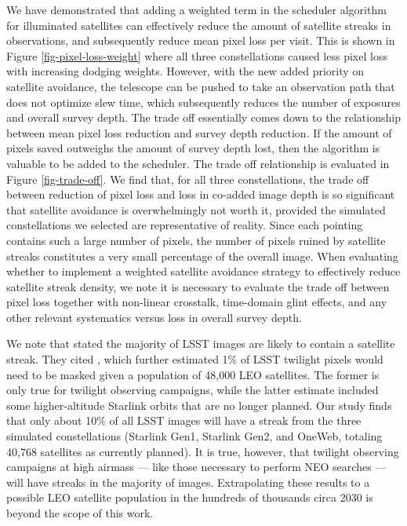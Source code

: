 \documentclass[twocolumn]{aastex631}
\begin{document}
We have demonstrated that adding a weighted term in the scheduler algorithm for illuminated satellites can effectively reduce the amount of satellite streaks in observations, and subsequently reduce mean pixel loss per visit. This is shown in Figure \ref{fig-pixel-loss-weight} where all three constellations caused less pixel loss with increasing dodging weights. However, with the new added priority on satellite avoidance, the telescope can be pushed to take an observation path that does not optimize slew time, which subsequently reduces the number of exposures and overall survey depth. The trade off essentially comes down to the relationship between mean pixel loss reduction and survey depth reduction. If the amount of pixels saved outweighs the amount of survey depth lost, then the algorithm is valuable to be added to the scheduler. The trade off relationship is evaluated in Figure \ref{fig-trade-off}. We find that, for all three constellations, the trade off between reduction of pixel loss and loss in co-added image depth is so significant that satellite avoidance is overwhelmingly not worth it, provided the simulated constellations we selected are representative of reality. Since each pointing contains such a large number of pixels, the number of pixels ruined by satellite streaks constitutes a very small percentage of the overall image.
When evaluating whether to implement a weighted satellite avoidance strategy to effectively reduce satellite streak density, we note it is necessary to evaluate the trade off between pixel loss together with non-linear crosstalk, time-domain glint effects, and any other relevant systematics versus loss in overall survey depth. 

We note that \citet{lawrence22} stated the majority of LSST images are likely to contain a satellite streak. They cited \citet{tyson20}, which further estimated 1\% of LSST twilight pixels would need to be masked given a population of 48,000 LEO satellites. The former is only true for twilight observing campaigns, while the latter estimate included some higher-altitude Starlink orbits that are no longer planned. Our study finds that only about 10\% of all LSST images will have a streak from the three simulated constellations (Starlink Gen1, Starlink Gen2, and OneWeb, totaling 40,768 satellites as currently planned). It is true, however, that twilight observing campaigns at high airmass --- like those necessary to perform NEO searches --- will have streaks in the majority of images. Extrapolating these results to a possible LEO satellite population in the hundreds of thousands circa 2030 is beyond the scope of this work.
\end{document}
